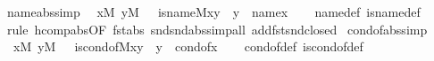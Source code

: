 \begin{isabellebody}
\endisatagproof
{\isafoldproof}%
%
\isadelimproof
\isanewline
%
\endisadelimproof
\isanewline
{}\isamarkupfalse%
\ name{}{\isacharunderscore}{\kern0pt}abs{\isacharbrackleft}{\kern0pt}simp{\isacharbrackright}{\kern0pt}{\isacharcolon}{\kern0pt}\isanewline
\ \ {\isachardoublequoteopen}{\isasymlbrakk}x{\isasymin}M{\isacharsemicolon}{\kern0pt}\ y{\isasymin}M\ {\isasymrbrakk}\ {\isasymLongrightarrow}\ is{\isacharunderscore}{\kern0pt}name{}{\isacharparenleft}{\kern0pt}{\isacharhash}{\kern0pt}{\isacharhash}{\kern0pt}M{\isacharcomma}{\kern0pt}x{\isacharcomma}{\kern0pt}y{\isacharparenright}{\kern0pt}\ {\isasymlongleftrightarrow}\ y\ {\isacharequal}{\kern0pt}\ name{}{\isacharparenleft}{\kern0pt}x{\isacharparenright}{\kern0pt}{\isachardoublequoteclose}\isanewline
%
\isadelimproof
\ \ %
\endisadelimproof
%
\isatagproof
{}\isamarkupfalse%
\ name{}{\isacharunderscore}{\kern0pt}def\ is{\isacharunderscore}{\kern0pt}name{}{\isacharunderscore}{\kern0pt}def\isanewline
\ \ \isamarkupfalse%
\ {\isacharparenleft}{\kern0pt}rule\ hcomp{\isacharunderscore}{\kern0pt}abs{\isacharbrackleft}{\kern0pt}OF\ fst{\isacharunderscore}{\kern0pt}abs\ snd{\isacharunderscore}{\kern0pt}snd{\isacharunderscore}{\kern0pt}abs{\isacharbrackright}{\kern0pt}{\isacharsemicolon}{\kern0pt}simp{\isacharunderscore}{\kern0pt}all\ add{\isacharcolon}{\kern0pt}fst{\isacharunderscore}{\kern0pt}snd{\isacharunderscore}{\kern0pt}closed{\isacharparenright}{\kern0pt}%
\endisatagproof
{\isafoldproof}%
%
\isadelimproof
\isanewline
%
\endisadelimproof
\isanewline
{}\isamarkupfalse%
\ cond{\isacharunderscore}{\kern0pt}of{\isacharunderscore}{\kern0pt}abs{\isacharbrackleft}{\kern0pt}simp{\isacharbrackright}{\kern0pt}{\isacharcolon}{\kern0pt}\isanewline
\ \ {\isachardoublequoteopen}{\isasymlbrakk}x{\isasymin}M{\isacharsemicolon}{\kern0pt}\ y{\isasymin}M\ {\isasymrbrakk}\ {\isasymLongrightarrow}\ is{\isacharunderscore}{\kern0pt}cond{\isacharunderscore}{\kern0pt}of{\isacharparenleft}{\kern0pt}{\isacharhash}{\kern0pt}{\isacharhash}{\kern0pt}M{\isacharcomma}{\kern0pt}x{\isacharcomma}{\kern0pt}y{\isacharparenright}{\kern0pt}\ {\isasymlongleftrightarrow}\ y\ {\isacharequal}{\kern0pt}\ cond{\isacharunderscore}{\kern0pt}of{\isacharparenleft}{\kern0pt}x{\isacharparenright}{\kern0pt}{\isachardoublequoteclose}\isanewline
%
\isadelimproof
\ \ %
\endisadelimproof
%
\isatagproof
{}\isamarkupfalse%
\ cond{\isacharunderscore}{\kern0pt}of{\isacharunderscore}{\kern0pt}def\ is{\isacharunderscore}{\kern0pt}cond{\isacharunderscore}{\kern0pt}of{\isacharunderscore}{\kern0pt}def\isanewline

\end{isabellebody}
